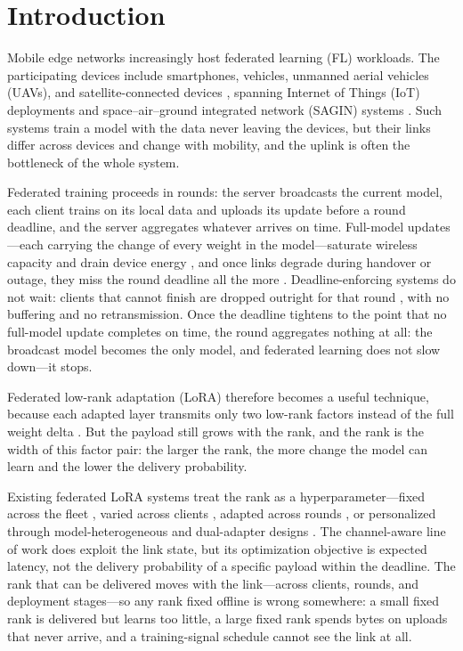 \documentclass[a4paper,fleqn]{cas-dc}
\begin{document}
\section{Introduction}
\label{sec:intro}
Mobile edge networks increasingly host federated learning (FL) workloads. The participating devices include smartphones, vehicles, unmanned aerial vehicles (UAVs), and satellite-connected devices \cite{mcmahan2017fedavg,kairouz2021advances}, spanning Internet of Things (IoT) deployments \cite{nguyen2021iotfl} and space--air--ground integrated network (SAGIN) systems \cite{liu2018sagin,mahboob2024ntn}. Such systems train a model with the data never leaving the devices, but their links differ across devices and change with mobility, and the uplink is often the bottleneck of the whole system.
\par
Federated training proceeds in rounds: the server broadcasts the current model, each client trains on its local data and uploads its update before a round deadline, and the server aggregates whatever arrives on time. Full-model updates---each carrying the change of every weight in the model---saturate wireless capacity and drain device energy \cite{hamdi2022ehfl}, and once links degrade during handover or outage, they miss the round deadline all the more \cite{razmi2022ground,tang2023flsagin,qin2024dfrl,ribero2023intermittent}. Deadline-enforcing systems do not wait: clients that cannot finish are dropped outright for that round \cite{nishio2019fedcs}, with no buffering and no retransmission. Once the deadline tightens to the point that no full-model update completes on time, the round aggregates nothing at all: the broadcast model becomes the only model, and federated learning does not slow down---it stops.
\par
Federated low-rank adaptation (LoRA) therefore becomes a useful technique, because each adapted layer transmits only two low-rank factors instead of the full weight delta \cite{hu2022lora,babakniya2023slora,zhang2024fedit}. But the payload still grows with the rank, and the rank is the width of this factor pair: the larger the rank, the more change the model can learn and the lower the delivery probability.
\par
Existing federated LoRA systems treat the rank as a hyperparameter---fixed across the fleet \cite{sun2024ffalora,zhang2023fedpetuning}, varied across clients \cite{cho2024hetlora,fan2025helora}, adapted across rounds \cite{wu2026fedara,yang2024safedlora}, or personalized through model-heterogeneous and dual-adapter designs \cite{yi2026pfedlora,yang2024feddpa}. The channel-aware line of work does exploit the link state, but its optimization objective is expected latency, not the delivery probability of a specific payload within the deadline. The rank that can be delivered moves with the link---across clients, rounds, and deployment stages---so any rank fixed offline is wrong somewhere: a small fixed rank is delivered but learns too little, a large fixed rank spends bytes on uploads that never arrive, and a training-signal schedule cannot see the link at all.
\end{document}
